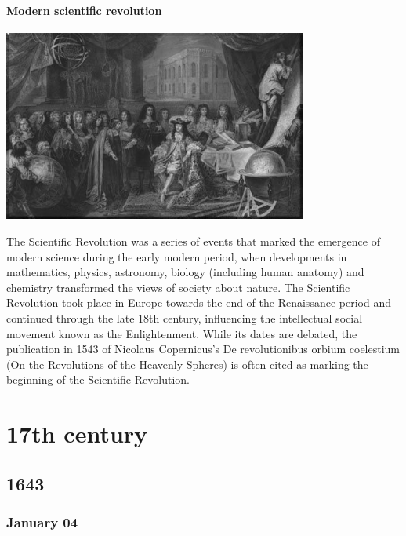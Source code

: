 \documentclass[11pt]{report}
\begin{document}
\subsection{Modern scientific revolution}
\vspace{2mm}\begin{center}\includegraphics[width=10cm]{./img/screvolution.jpg}\end{center}
The Scientific Revolution was a series of events that marked the emergence of modern science during the early modern period, when developments in mathematics, physics, astronomy, biology (including human anatomy) and chemistry transformed the views of society about nature. The Scientific Revolution took place in Europe towards the end of the Renaissance period and continued through the late 18th century, influencing the intellectual social movement known as the Enlightenment. While its dates are debated, the publication in 1543 of Nicolaus Copernicus's De revolutionibus orbium coelestium (On the Revolutions of the Heavenly Spheres) is often cited as marking the beginning of the Scientific Revolution.


		
\part{17th century}
\chapter{1643}
\section{January 04}
\end{document}
